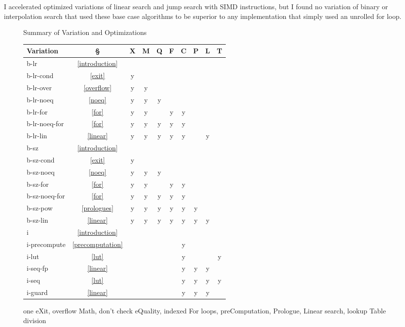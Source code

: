 \documentclass[twocolumn]{article}
\begin{document}
I accelerated optimized variations of linear search and jump search with SIMD instructions, but I found no variation of binary or interpolation search that used these base case algorithms to be superior to any implementation that simply used an unrolled for loop.

\setlength{\tabcolsep}{5pt}
\begin{figure}[ht]
  \caption{Summary of Variation and Optimizations}
\begin{tabular}{l*{9}c}
  Variation & \S & X & M & Q & F & C & P & L & T \\
	\hline
  b-lr & \ref{introduction} \\
  b-lr-cond & \ref{exit} & y \\
  b-lr-over & \ref{overflow} & y & y \\
  b-lr-noeq & \ref{noeq} & y & y & y \\
  b-lr-for & \ref{for} & y & y & & y & y \\
  b-lr-noeq-for & \ref{for} & y & y & y & y & y \\
  b-lr-lin & \ref{linear} & y & y & y & y & y & & y & \\

  b-sz & \ref{introduction} \\
  b-sz-cond & \ref{exit} & y \\
  b-sz-noeq & \ref{noeq} & y & y & y \\
  b-sz-for & \ref{for} & y & y & & y & y \\
  b-sz-noeq-for & \ref{for} & y & y & y & y & y \\
  b-sz-pow & \ref{prologues} & y & y & y & y & y & y \\
  b-sz-lin & \ref{linear} & y & y & y & y & y & y & y & \\
	
  i & \ref{introduction} \\
  i-precompute & \ref{precomputation} & & & & & y \\
  i-lut        & \ref{lut} & & & & & y & & & y \\
  i-seq-fp     & \ref{linear} & & & & & y & y & y \\
  i-seq        & \ref{lut} & & & & & y & y & y & y \\
  i-guard     & \ref{linear} & & & & & y & y & y \\
\end{tabular}
  \caption{one eXit, overflow Math, don't check eQuality, indexed For loops, preComputation, Prologue, Linear search, lookup Table division}
  \label{table}
\end{figure}
\end{document}
